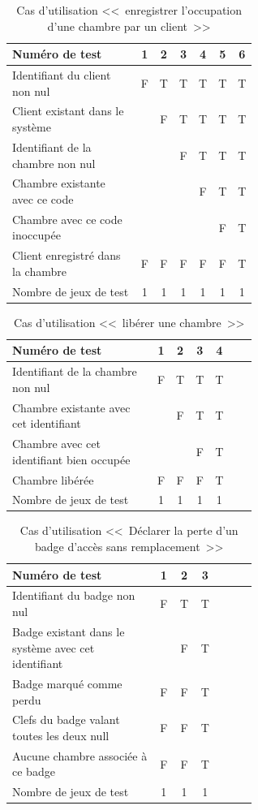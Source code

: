 \documentclass[11pt,article]{article}
\newcommand{\nullvalue}{\textsf{null}\xspace}
\begin{document}
\begin{table}[htbp!]
\begin{tabular}{|p{0.6\linewidth}|c|c|c|c|c|c|}
\hline
Numéro de test
&1&2&3&4&5&6\\
\hline
\hline
Identifiant du client non nul
&F&T&T&T&T&T\\
\hline
Client existant dans le système
& &F&T&T&T&T\\
\hline
Identifiant de la chambre non nul
& & &F&T&T&T\\
\hline
Chambre existante avec ce code
& & & &F&T&T\\
\hline
Chambre avec ce code inoccupée
& & & & &F&T\\
\hline
\hline
Client enregistré dans la chambre
&F&F&F&F&F&T\\
\hline
\hline
Nombre de jeux de test
&1&1&1&1&1&1\\
\hline
\end{tabular}
\caption{Cas d'utilisation <<~enregistrer l'occupation d'une chambre par un client~>>}
\end{table}

\begin{table}[htbp!]
\begin{tabular}{|p{0.6\linewidth}|c|c|c|c|c|c|}
\hline
Numéro de test
&1&2&3&4\\
\hline
\hline
Identifiant de la chambre non nul
&F&T&T&T\\
\hline
Chambre existante avec cet identifiant
& &F&T&T\\
\hline
Chambre avec cet identifiant bien occupée
& & &F&T\\
\hline
\hline
Chambre libérée
&F&F&F&T\\
\hline
\hline
Nombre de jeux de test
&1&1&1&1\\
\hline
\end{tabular}
\caption{Cas d'utilisation <<~libérer une chambre~>>}
\end{table}
\newpage

\begin{table}[htbp!]
\begin{tabular}{|p{0.6\linewidth}|c|c|c|c|c|c|}
\hline
Numéro de test
&1&2&3\\
\hline
\hline
Identifiant du badge non nul
&F&T&T\\
\hline
Badge existant dans le système avec cet identifiant
& &F&T\\
\hline
\hline
Badge marqué comme perdu
&F&F&T\\
\hline
Clefs du badge valant toutes les deux \nullvalue
&F&F&T\\
\hline
Aucune chambre associée à ce badge
&F&F&T\\
\hline
\hline
Nombre de jeux de test
&1&1&1\\
\hline
\end{tabular}
\caption{Cas d'utilisation <<~Déclarer la perte d'un badge d'accès sans remplacement~>>}
\end{table}
\newpage
\end{document}
